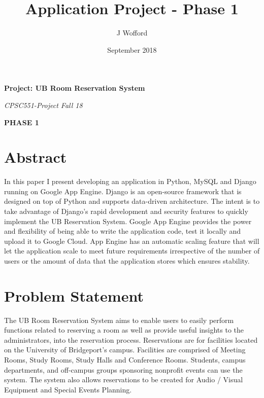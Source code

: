 \documentclass[11pt]{report}
\title{Application Project - Phase 1}
\author{J Wofford}
\date{September 2018}
\begin{document}
\raggedright


\begin{titlepage}
   \begin{center}
      \Large\textbf{Project: UB Room Reservation System}
      
     \vspace*{3\bigskipamount}
      \large\bfseries\textit{}
      
      \large\textit{CPSC551-Project Fall 18}
      
       \Large\textbf{PHASE 1}
       
   \end{center}
\end{titlepage}

\section*{Abstract}
In this paper I present developing an application in Python, MySQL and Django running on Google App Engine. Django is an open-source framework that is designed on top of Python and supports data-driven architecture.  The intent is to take advantage of Django’s rapid development and security features to quickly implement the UB Reservation System. Google App Engine provides the power and flexibility of being able to write the application code, test it locally and upload it to Google Cloud. App Engine has an automatic scaling feature that will let the application scale to meet future requirements irrespective of the number of users or the amount of data that the application stores which ensures stability. 

\section*{Problem Statement}
The UB Room Reservation System aims to enable users to easily perform functions related to reserving a room as well as provide useful insights to the administrators, into the reservation process.  Reservations are for facilities located on the University of Bridgeport’s campus. Facilities are comprised of Meeting Rooms, Study Rooms, Study Halls and Conference Rooms.  Students, campus departments, and off-campus groups sponsoring nonprofit events can use the system. The system also allows reservations to be created for Audio / Visual Equipment and Special Events Planning. 
\end{document}
